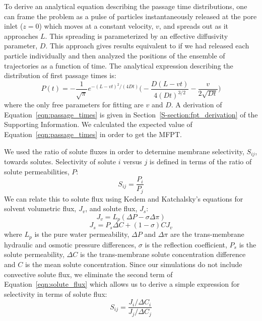 \documentclass[journal=jctcce,manuscript=article]{achemso}
\begin{document}
  To derive an analytical equation describing the passage time distributions,
  one can frame the problem as a pulse of particles instantaneously released at
  the pore inlet ($z=0$) which moves at a constant velocity, $v$, and spreads
  out as it approaches $L$. This spreading is parameterized by an effective
  diffusivity parameter, $D$. This approach gives results equivalent to if we
  had released each particle individually and then analyzed the positions of
  the ensemble of trajectories as a function of time. The analytical expression
  describing the distribution of first passage times
  is:~\cite{cussler_diffusion:_2009}
  \begin{equation}
  P(t) = -\frac{1}{\sqrt{\pi}}e^{-(L - vt)^2 / (4Dt)}\bigg(-\frac{D(L - vt)}{4(Dt)^{3/2}} - \frac{v}{2\sqrt{Dt}}\bigg)
  \label{eqn:passage_times}
  \end{equation} 
  where the only free parameters for fitting are $v$ and $D$. A derivation of
  Equation~\ref{eqn:passage_times} is given in
  Section~\ref{S-section:fpt_derivation} of the Supporting Information. We
  calculated the expected value of Equation~\ref{eqn:passage_times} in order to
  get the MFPT.

  We used the ratio of solute fluxes in order to determine membrane
  selectivity, $S_{ij}$, towards solutes. Selectivity of solute $i$ versus $j$
  is defined in terms of the ratio of solute permeabilities,
  $P$:~\cite{guo_pervaporation_2004}
  \begin{equation}
  S_{ij} = \frac{P_i}{P_j}
  \end{equation}
  We can relate this to solute flux using Kedem and Katchalsky's equations for
  solvent volumetric flux, $J_v$, and solute flux,
  $J_s$:~\cite{kedem_permeability_1963,al-zoubi_rejection_2007}
  \begin{equation}
  J_v = L_p(\Delta P - \sigma\Delta \pi)
  \end{equation} 
  \begin{equation}
  J_s = P_s \Delta C + (1 - \sigma)CJ_v
  \label{eqn:solute_flux}
  \end{equation}
  where $L_p$ is the pure water permeability, $\Delta P$ and $\Delta \pi$ are
  the trans-membrane hydraulic and osmotic pressure differences, $\sigma$ is
  the reflection coefficient, $P_s$ is the solute permeability, $\Delta C$ is
  the trans-membrane solute concentration difference and $C$ is the mean solute
  concentration. Since our simulations do not include convective solute flux,
  we eliminate the second term of Equation~\ref{eqn:solute_flux} which allows
  us to derive a simple expression for selectivity in terms of solute flux:
  \begin{equation}
  S_{ij} = \frac{J_i / \Delta C_i}{J_j / \Delta C_j}
  \label{eqn:selectivity}
  \end{equation}
  
\end{document}
